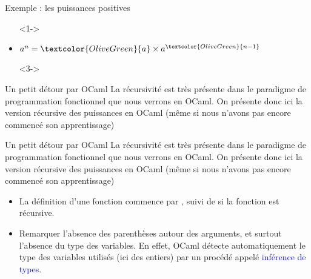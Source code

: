 \documentclass[10pt]{beamer}
\begin{document}
\begin{frame}[fragile]{\Ctitle}{\stitle}
	\begin{exampleblock}{Exemple : les puissances positives}
		\begin{itemize}
			\item[]<1-> 
			\item<2-> $a^n = \textcolor{OliveGreen}{a} \times a^{\textcolor{OliveGreen}{n-1}}$
			\item[]<3-> 
		\end{itemize}
	\end{exampleblock}
\end{frame}

\begin{frame}[fragile]{\Ctitle}{\stitle}
	\begin{block}{Un petit détour par OCaml}
		La récursivité est très présente dans le paradigme de programmation fonctionnel que nous verrons en OCaml.
		On présente donc ici la version récursive des puissances en OCaml (même si nous n'avons pas encore commencé son apprentissage)
		\onslide<2->
	\end{block}
\end{frame}

\begin{frame}[fragile]{\Ctitle}{\stitle}
	\begin{block}{Un petit détour par OCaml}
		La récursivité est très présente dans le paradigme de programmation fonctionnel que nous verrons en OCaml.
		On présente donc ici la version récursive des puissances en OCaml (même si nous n'avons pas encore commencé son apprentissage)
		\begin{itemize}
			\item <2-> La définition d'une fonction commence par , suivi de  si la fonction est récursive.
			\item <3-> Remarquer l'absence des parenthèses autour des arguments, et surtout l'absence du type des variables. En effet, OCaml détecte automatiquement le type des variables utilisés (ici des entiers) par un procédé appelé \textcolor{blue}{inférence de types}.
		\end{itemize}
	\end{block}
\end{frame}
\end{document}

